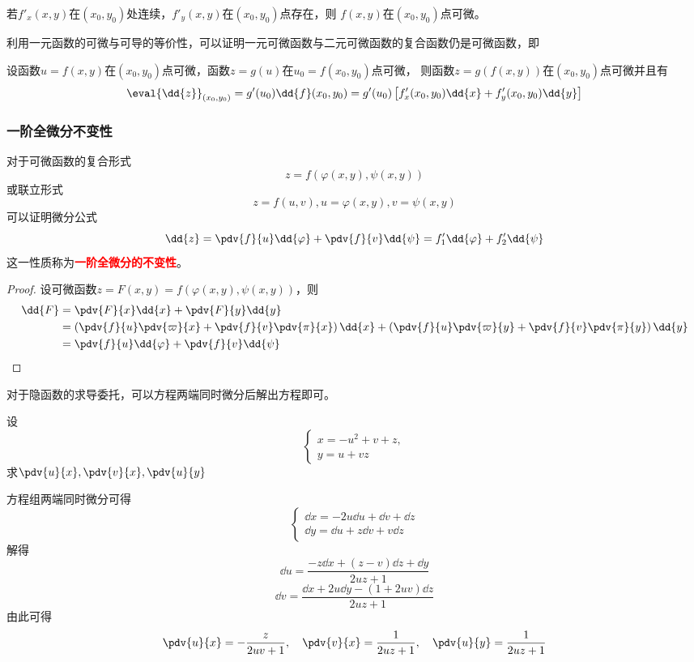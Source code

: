 \begin{theorem}
    若$f'_x(x,y)$在$(x_0,y_0)$处连续，$f'_y(x,y)$在$(x_0,y_0)$点存在，则
    $f(x,y)$在$(x_0,y_0)$点可微。
\end{theorem}

利用一元函数的可微与可导的等价性，可以证明一元可微函数与二元可微函数的复合函数仍是可微函数，即
\begin{theorem}
    设函数$u=f(x,y)$在$(x_0,y_0)$点可微，函数$z=g(u)$在$u_0=f(x_0,y_0)$点可微，
    则函数$z=g(f(x,y))$在$(x_0,y_0)$点可微并且有
    \[ \eval{\dd{z}}_{(x_0,y_0)} = g'(u_0)\dd{f}(x_0,y_0) = g'(u_0)\left[f'_x(x_0,y_0)\dd{x} + f'_y(x_0,y_0)\dd{y}\right] \]
\end{theorem}

\subsubsection{一阶全微分不变性}
对于可微函数的复合形式
\[ z= f(\varphi(x,y),\psi(x,y)) \]
或联立形式
\[ z = f(u,v), u=\varphi(x,y), v=\psi(x,y) \]
可以证明微分公式
\begin{equation}
    \dd{z}
    = \pdv{f}{u}\dd{\varphi} + \pdv{f}{v}\dd{\psi}
    = f'_1\dd{\varphi} + f'_2\dd{\psi}
\end{equation}
这一性质称为\textcolor{red}{\textbf{\textsf{一阶全微分的不变性}}}。
\begin{proof}
    设可微函数$z=F(x,y) = f(\varphi(x,y), \psi(x,y))$，则
    \begin{align*}
        \dd{F} & = \pdv{F}{x}\dd{x} + \pdv{F}{y}\dd{y}                                   \\
               & = \left(\pdv{f}{u}\pdv{\varpi}{x} + \pdv{f}{v}\pdv{\pi}{x}\right)\dd{x}
        +\left(\pdv{f}{u}\pdv{\varpi}{y} + \pdv{f}{v}\pdv{\pi}{y}\right)\dd{y}           \\
               & =\pdv{f}{u}\dd{\varphi} + \pdv{f}{v}\dd{\psi}
    \end{align*}
\end{proof}

对于隐函数的求导委托，可以方程两端同时微分后解出方程即可。
\begin{example}
    设
    \[
        \begin{cases}
            x=-u^2+v+z, \\
            y=u+vz
        \end{cases}
    \]
    求$\displaystyle \pdv{u}{x}, \pdv{v}{x}, \pdv{u}{y}$
\end{example}
\begin{solution}
    方程组两端同时微分可得
    \[
        \begin{cases}
            \dd{x} = -2u\dd{u} + \dd{v} + \dd{z} \\
            \dd{y} = \dd{u} + z\dd{v} + v\dd{z}
        \end{cases}
    \]
    解得
    \[ \dd{u} = \frac{-z\dd{x} + (z-v)\dd{z} + \dd{y}}{2uz + 1} \]
    \[ \dd{v} = \frac{\dd{x} + 2u\dd{y} - (1+2uv)\dd{z}}{2uz + 1} \]
    由此可得
    \[
        \pdv{u}{x} = -\frac{z}{2uv+1},\quad
        \pdv{v}{x} = \frac{1}{2uz+1},\quad
        \pdv{u}{y} = \frac{1}{2uz+1}
    \]
\end{solution}

